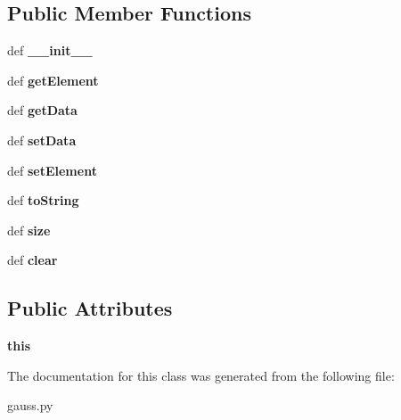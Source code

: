 \subsection*{Public Member Functions}
\begin{DoxyCompactItemize}
\item 
\hypertarget{classgauss_1_1_g_e_string_array_adeb64f7f09497d2a8e9d87562881536f}{def {\bfseries \-\_\-\-\_\-init\-\_\-\-\_\-}}\label{classgauss_1_1_g_e_string_array_adeb64f7f09497d2a8e9d87562881536f}

\item 
\hypertarget{classgauss_1_1_g_e_string_array_ae36de5cc04fcf93eeaa4d64eb2e0a944}{def {\bfseries get\-Element}}\label{classgauss_1_1_g_e_string_array_ae36de5cc04fcf93eeaa4d64eb2e0a944}

\item 
\hypertarget{classgauss_1_1_g_e_string_array_a8d2ae87613840d2feb497534ab30e22c}{def {\bfseries get\-Data}}\label{classgauss_1_1_g_e_string_array_a8d2ae87613840d2feb497534ab30e22c}

\item 
\hypertarget{classgauss_1_1_g_e_string_array_a627c22135413607af38aa2507fa914fc}{def {\bfseries set\-Data}}\label{classgauss_1_1_g_e_string_array_a627c22135413607af38aa2507fa914fc}

\item 
\hypertarget{classgauss_1_1_g_e_string_array_a898277f09fa4fbd4447e877a4d054aec}{def {\bfseries set\-Element}}\label{classgauss_1_1_g_e_string_array_a898277f09fa4fbd4447e877a4d054aec}

\item 
\hypertarget{classgauss_1_1_g_e_string_array_a3d3b437ae1bd73878253d1c95978c499}{def {\bfseries to\-String}}\label{classgauss_1_1_g_e_string_array_a3d3b437ae1bd73878253d1c95978c499}

\item 
\hypertarget{classgauss_1_1_g_e_string_array_a7bbf11be4d1e5270457c3f1e44f1b294}{def {\bfseries size}}\label{classgauss_1_1_g_e_string_array_a7bbf11be4d1e5270457c3f1e44f1b294}

\item 
\hypertarget{classgauss_1_1_g_e_string_array_a65c64370269cb8ce0144db07f1dcef30}{def {\bfseries clear}}\label{classgauss_1_1_g_e_string_array_a65c64370269cb8ce0144db07f1dcef30}

\end{DoxyCompactItemize}
\subsection*{Public Attributes}
\begin{DoxyCompactItemize}
\item 
\hypertarget{classgauss_1_1_g_e_string_array_a6aa7390a8221b81b48b34d6639ba4b17}{{\bfseries this}}\label{classgauss_1_1_g_e_string_array_a6aa7390a8221b81b48b34d6639ba4b17}

\end{DoxyCompactItemize}


The documentation for this class was generated from the following file\-:\begin{DoxyCompactItemize}
\item 
gauss.\-py\end{DoxyCompactItemize}
